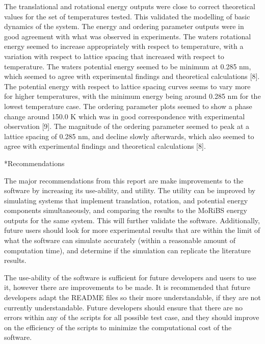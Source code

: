 \documentclass[11pt]{article}
\makeatletter
\let\workreportsection\section
\renewcommand{\section}{\@ifstar{\workreportstarsection}{\workreportsection}}
\newcommand{\workreportstarsection}[1]{\workreportsection*{#1}\addcontentsline{toc}{section}{#1}}
\makeatother
\begin{document}
The translational and rotational energy outputs were close to correct theoretical values for the set of temperatures tested. This validated the modelling of basic dynamics of the system. The energy and ordering parameter outputs were in good agreement with what was observed in experiments. The waters rotational energy seemed to increase appropriately with respect to temperature, with a variation with respect to lattice spacing that increased with respect to temperature. The waters potential energy seemed to be minimum at 0.285 nm, which seemed to agree with experimental findings and theoretical calculations [8]. The potential energy with respect to lattice spacing curves seems to vary more for higher temperatures, with the minimum energy being around 0.285 nm for the lowest temperature case. The ordering parameter plots seemed to show a phase change around 150.0 K which was in good correspondence with experimental observation [9]. The magnitude of the ordering parameter seemed to peak at a lattice spacing of 0.285 nm, and decline slowly afterwards, which also seemed to agree with experimental findings and theoretical calculations [8]. 

\section*{Recommendations}

The major recommendations from this report are make improvements to the software by increasing its use-ability, and utility. The utility can be improved by simulating systems that implement translation, rotation, and potential energy components simultaneously, and comparing the results to the MoRiBS energy outputs for the same system. This will further validate the software. Additionally, future users should look for more experimental results that are within the limit of what the software can simulate accurately (within a reasonable amount of computation time), and determine if the simulation can replicate the literature results. 

The use-ability of the software is sufficient for future developers and users to use it, however there are improvements to be made. It is recommended that future developers adapt the README files so their more understandable, if they are not currently understandable. Future developers should ensure that there are no errors within any of the scripts for all possible test case, and they should improve on the efficiency of the scripts to minimize the computational cost of the software. 
\end{document}
